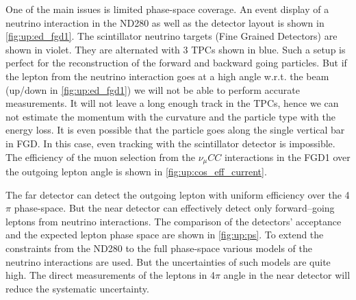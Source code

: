 \documentclass[main.tex]{subfiles}
\begin{document}
One of the main issues is limited phase-space coverage. An event display of a neutrino interaction in the ND280 as well as the detector layout is shown in \autoref{fig:up:ed_fgd1}. The scintillator neutrino targets (Fine Grained Detectors) are shown in violet. They are alternated with 3 TPCs shown in blue. Such a setup is perfect for the reconstruction of the forward and backward going particles. But if the lepton from the neutrino interaction goes at a high angle w.r.t. the beam (up/down in \autoref{fig:up:ed_fgd1}) we will not be able to perform accurate measurements. It will not leave a long enough track in the TPCs, hence we can not estimate the momentum with the curvature and the particle type with the energy loss. It is even possible that the particle goes along the single vertical bar in FGD. In this case, even tracking with the scintillator detector is impossible. The efficiency of the muon selection from the $\nu_\mu CC$ interactions in the FGD1 over the outgoing lepton angle is shown in \autoref{fig:up:cos_eff_current}.

The far detector can detect the outgoing lepton with uniform efficiency over the 4$\pi$ phase-space. But the near detector can effectively detect only forward--going leptons from neutrino interactions. The comparison of the detectors' acceptance and the expected lepton phase space are shown in \autoref{fig:up:ps}. To extend the constraints from the ND280 to the full phase-space various models of the neutrino interactions are used. But the uncertainties of such models are quite high. The direct measurements of the leptons in 4$\pi$ angle in the near detector will reduce the systematic uncertainty.
\end{document}
